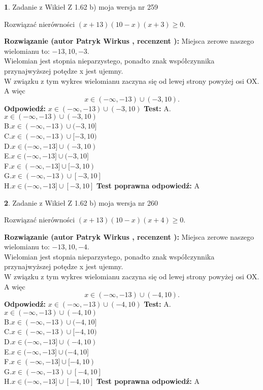 \documentclass[12pt, a4paper]{article}
\theoremstyle{definition} %
\newtheorem{zad}{}
\newcommand{\zadStart}[1]{\begin{zad}#1\newline}
\newcommand{\zadStop}{\end{zad}}
\newcommand{\rozwStart}[2]{\noindent \textbf{Rozwiązanie (autor #1 , recenzent #2): }\newline}
\newcommand{\rozwStop}{\newline}
\newcommand{\odpStart}{\noindent \textbf{Odpowiedź:}\newline}
\newcommand{\odpStop}{\newline}
\newcommand{\testStart}{\noindent \textbf{Test:}\newline}
\newcommand{\testStop}{\newline}
\newcommand{\kluczStart}{\noindent \textbf{Test poprawna odpowiedź:}\newline}
\newcommand{\kluczStop}{\newline}
\begin{document}
\zadStart{Zadanie z Wikieł Z 1.62 b) moja wersja nr 259}

Rozwiązać nierówności $(x+13)(10-x)(x+3)\ge0$.
\zadStop
\rozwStart{Patryk Wirkus}{}
Miejsca zerowe naszego wielomianu to: $-13, 10, -3$.\\
Wielomian jest stopnia nieparzystego, ponadto znak współczynnika przy\linebreak najwyższej potędze x jest ujemny.\\ W związku z tym wykres wielomianu zaczyna się od lewej strony powyżej osi OX. A więc $$x \in (-\infty,-13) \cup (-3,10).$$
\rozwStop
\odpStart
$x \in (-\infty,-13) \cup (-3,10)$
\odpStop
\testStart
A.$x \in (-\infty,-13) \cup (-3,10)$\\
B.$x \in (-\infty,-13) \cup (-3,10]$\\
C.$x \in (-\infty,-13) \cup [-3,10)$\\
D.$x \in (-\infty,-13] \cup (-3,10)$\\
E.$x \in (-\infty,-13] \cup (-3,10]$\\
F.$x \in (-\infty,-13] \cup [-3,10)$\\
G.$x \in (-\infty,-13) \cup [-3,10]$\\
H.$x \in (-\infty,-13] \cup [-3,10]$
\testStop
\kluczStart
A
\kluczStop



\zadStart{Zadanie z Wikieł Z 1.62 b) moja wersja nr 260}

Rozwiązać nierówności $(x+13)(10-x)(x+4)\ge0$.
\zadStop
\rozwStart{Patryk Wirkus}{}
Miejsca zerowe naszego wielomianu to: $-13, 10, -4$.\\
Wielomian jest stopnia nieparzystego, ponadto znak współczynnika przy\linebreak najwyższej potędze x jest ujemny.\\ W związku z tym wykres wielomianu zaczyna się od lewej strony powyżej osi OX. A więc $$x \in (-\infty,-13) \cup (-4,10).$$
\rozwStop
\odpStart
$x \in (-\infty,-13) \cup (-4,10)$
\odpStop
\testStart
A.$x \in (-\infty,-13) \cup (-4,10)$\\
B.$x \in (-\infty,-13) \cup (-4,10]$\\
C.$x \in (-\infty,-13) \cup [-4,10)$\\
D.$x \in (-\infty,-13] \cup (-4,10)$\\
E.$x \in (-\infty,-13] \cup (-4,10]$\\
F.$x \in (-\infty,-13] \cup [-4,10)$\\
G.$x \in (-\infty,-13) \cup [-4,10]$\\
H.$x \in (-\infty,-13] \cup [-4,10]$
\testStop
\kluczStart
A
\kluczStop
\end{document}
